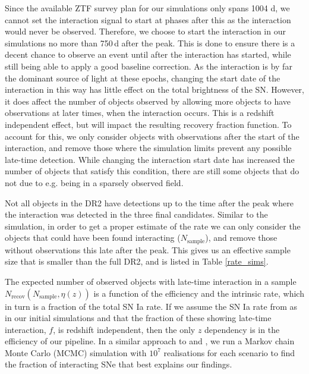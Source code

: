 \documentclass[a4paper,oneside,12pt, class=Latex/Classes/PhDthesisPSnPDF, crop=false]{standalone}
\begin{document}
Since the available ZTF survey plan for our simulations only spans 1004 d, we cannot set the interaction signal to start at phases after this as the interaction would never be observed. Therefore, we choose to start the interaction in our simulations no more than 750\,d after the peak. This is done to ensure there is a decent chance to observe an event until after the interaction has started, while still being able to apply a good baseline correction. As the interaction is by far the dominant source of light at these epochs, changing the start date of the interaction in this way has little effect on the total brightness of the SN. However, it does affect the number of objects observed by allowing more objects to have observations at later times, when the interaction occurs. This is a redshift independent effect, but will impact the resulting recovery fraction function. To account for this, we only consider objects with observations after the start of the interaction, and remove those where the simulation limits prevent any possible late-time detection. While changing the interaction start date has increased the number of objects that satisfy this condition, there are still some objects that do not due to e.g. being in a sparsely observed field.

Not all objects in the DR2 have detections up to the time after the peak where the interaction was detected in the three final candidates. Similar to the simulation, in order to get a proper estimate of the rate we can only consider the objects that could have been found interacting ($N_\text{sample}$), and remove those without observations this late after the peak. This gives us an effective sample size that is smaller than the full DR2, and is listed in Table \ref{rate_sims}.

The expected number of observed objects with late-time interaction in a sample $N_\text{recov}(N_\text{sample}, \eta(z))$ is a function of the efficiency and the intrinsic rate, which in turn is a fraction of the total SN Ia rate. If we assume the SN Ia rate from \citet{SNIa_rate} as in our initial simulations and that the fraction of these showing late-time interaction, $f$, is redshift independent, then the only $z$ dependency is in the efficiency of our pipeline. In a similar approach to \citet{SLSN_rate} and \citet{Ca-rich_rate}, we run a Markov chain Monte Carlo (MCMC) simulation with $10^7$ realisations for each scenario to find the fraction of interacting SNe that best explains our findings.
\end{document}
